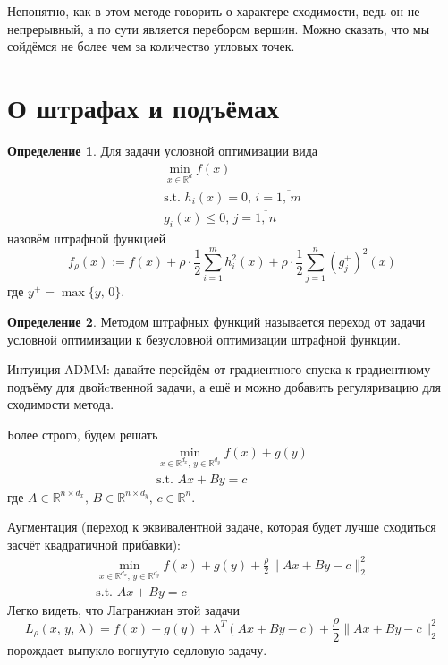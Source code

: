 \documentclass[a4paper,12pt]{article}
\renewcommand{\leq}{\ensuremath{\leqslant}}
\theoremstyle{plain}
\theoremstyle{definition}
\newtheorem{definition}{Определение}[section]
\theoremstyle{remark}
\begin{document}
Непонятно, как в этом методе говорить о характере сходимости, ведь он не непрерывный, а по сути является перебором вершин. Можно сказать, что мы сойдёмся не более чем за количество угловых точек.

\section{О штрафах и подъёмах}
\begin{definition}
  Для задачи условной оптимизации вида
  \begin{align*}
    \min_{x \in \mathbb{R}^d} f(x)\\
    \text{s.t. }h_i(x) = 0,\, i = \overline{1,\,m}\\
    g_i(x) \leq 0,\, j = \overline{1,\,n}
  \end{align*}
  назовём штрафной функцией 
  \[
    f_\rho(x) := f(x) + \rho\cdot\frac{1}{2}\sum_{i = 1}^m h_i^2(x) + \rho\cdot\frac{1}{2}\sum_{j = 1}^n (g_j^+)^2(x)
  \]
  где $y^+ = \max\{y,\, 0\}$.
\end{definition}

\begin{definition}
  Методом штрафных функций называется переход от задачи условной оптимизации к безусловной оптимизации штрафной функции.
\end{definition}

Интуиция ADMM: давайте перейдём от градиентного спуска к градиентному подъёму для двойcтвенной задачи, а ещё и можно добавить регуляризацию для сходимости метода.

Более строго, будем решать
\begin{align*}
  \min_{x \in \mathbb{R}^{d_x},\, y \in \mathbb{R}^{d_y}} f(x) + g(y)\\
  \text{s.t. }Ax + By = c
\end{align*}
где $A \in \mathbb{R}^{n \times d_x},\, B \in \mathbb{R}^{n \times d_y},\, c \in \mathbb{R}^n$.

Аугментация (переход к эквивалентной задаче, которая будет лучше сходиться засчёт квадратичной прибавки):
\begin{align*}
  \min_{x \in \mathbb{R}^{d_x},\, y \in \mathbb{R}^{d_y}} f(x) + g(y) + \frac{\rho}{2}\|Ax + By - c\|_2^2\\
  \text{s.t. }Ax + By = c
\end{align*}
Легко видеть, что Лагранжиан этой задачи
\[
  L_\rho(x,\,y,\,\lambda) = f(x) + g(y) + \lambda^T(Ax + By -  c) + \frac{\rho}{2}\|Ax + By - c\|_2^2 
\]
порождает выпукло-вогнутую седловую задачу.
\end{document}

